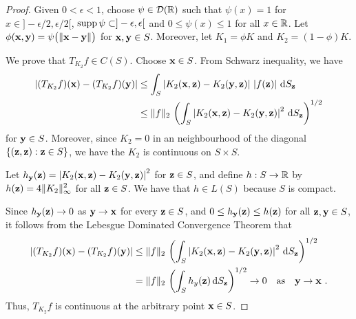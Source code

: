 \begin{proof}
Given $0 < \epsilon < 1$, choose $\psi \in \mathcal{D}(\mathbb{R})$ such that
$\psi(x)=1$ for $x \in ]-\epsilon/2, \epsilon/2[$,
$\operatorname{supp} \psi \subset ]-\epsilon, \epsilon[$ and $0\leq \psi(x)\leq 1$
for all $x\in \mathbb{R}$.  Let
$\phi(\mathbf{x},\mathbf{y}) = \psi\big(\|\mathbf{x}-\mathbf{y}\|\big)$ for
$\mathbf{x}, \mathbf{y} \in S$.  Moreover, let $K_1 = \phi K$ and
$K_2 = (1-\phi)K$.

 We prove that $T_{K_2} f \in C(S)$.  Choose $\mathbf{x}\in S$.
From Schwarz inequality, we have
\begin{align*}
\left| (T_{K_2} f)(\mathbf{x}) - (T_{K_2} f)(\mathbf{y})\right|
&\leq \int_S \left| K_2(\mathbf{x},\mathbf{z}) - K_2(\mathbf{y},\mathbf{z}) \right|\,
\left| f(\mathbf{z}) \right| \,\mathrm{d}{S}_{\mathbf{z}} \\
&\leq \|f\|_2 \, \left( \int_S \left|K_2(\mathbf{x},\mathbf{z}) -
K_2(\mathbf{y},\mathbf{z}) \right|^2 \,\mathrm{d}{S}_{\mathbf{z}} \right)^{1/2}
\end{align*}
for $\mathbf{y} \in S$.  Moreover, since $K_2 =0$ in an neighbourhood of
the diagonal $\{(\mathbf{z},\mathbf{z}) : \mathbf{z} \in S\}$, we have the
$K_2$ is continuous on $S\times S$.

Let
$\displaystyle h_{\mathbf{y}}(\mathbf{z}) = \left|K_2(\mathbf{x},\mathbf{z}) -
K_2(\mathbf{y},\mathbf{z})\right|^2$ for $\mathbf{z} \in S$, and define
$h:S \to \mathbb{R}$ by $\displaystyle h(\mathbf{z}) = 4\|K_2\|_\infty^2$
 for all $\mathbf{z} \in S$.
We have that $h \in L(S)$ because $S$ is compact.

Since $h_{\mathbf{y}}(\mathbf{z}) \rightarrow 0$ as
$\mathbf{y} \rightarrow \mathbf{x}$ for every $\mathbf{z} \in S$,
and $0\leq h_{\mathbf{y}}(\mathbf{z}) \leq h(\mathbf{z})$ for all
$\mathbf{z}, \mathbf{y}\in S$, it follows from the Lebesgue Dominated
Convergence Theorem that
\begin{align*}
\left| (T_{K_2} f)(\mathbf{x}) - (T_{K_2} f)(\mathbf{y})\right|
&\leq \|f\|_2 \, \left( \int_S \left|K_2(\mathbf{x},\mathbf{z}) -
K_2(\mathbf{y},\mathbf{z}) \right|^2 \,\mathrm{d}{S}_{\mathbf{z}} \right)^{1/2} \\
&= \|f\|_2 \, \left( \int_S h_y(\mathbf{z}) \,\mathrm{d}{S}_{\mathbf{z}} \right)^{1/2}
\rightarrow 0 \quad \text{as} \quad \mathbf{y} \rightarrow \mathbf{x} \ .
\end{align*}
Thus, $T_{K_2}f$ is continuous at the arbitrary point $\mathbf{x} \in S$.


\end{proof}
